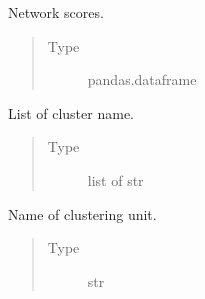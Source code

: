 \documentclass[letterpaper,10pt,english]{sphinxmanual}
\begin{document}
\begin{fulllineitems}
\begin{fulllineitems}
\end{fulllineitems}


\begin{fulllineitems}
\label{\detokenize{modules/celloracle:celloracle.Links.merged_score}}
Network scores.
\begin{quote}\begin{description}
\item[{Type}] \leavevmode
pandas.dataframe

\end{description}\end{quote}

\end{fulllineitems}


\begin{fulllineitems}
\label{\detokenize{modules/celloracle:celloracle.Links.cluster}}
List of cluster name.
\begin{quote}\begin{description}
\item[{Type}] \leavevmode
list of str

\end{description}\end{quote}

\end{fulllineitems}


\begin{fulllineitems}
\label{\detokenize{modules/celloracle:celloracle.Links.name}}
Name of clustering unit.
\begin{quote}\begin{description}
\item[{Type}] \leavevmode
str

\end{description}\end{quote}

\end{fulllineitems}


\end{fulllineitems}
\end{document}

